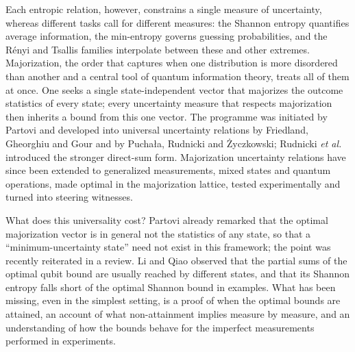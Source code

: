\documentclass[11pt]{article}
\theoremstyle{definition}
\begin{document}
Each entropic relation, however, constrains a single measure of uncertainty,
whereas different tasks call for different measures: the Shannon entropy
quantifies average information, the min-entropy governs guessing
probabilities\cite{KRS2009}, and the R\'enyi and Tsallis families interpolate
between these and other extremes. Majorization\cite{MarshallOlkin2011}, the
order that captures when one distribution is more disordered than another and
a central tool of quantum information
theory\cite{Nielsen1999,Gour2015,ChitambarGour2019}, treats all of them at once.
One seeks a single state-independent vector that majorizes the outcome
statistics of every state; every uncertainty measure that respects
majorization then inherits a bound from this one vector. The programme was
initiated by Partovi\cite{Partovi2011} and developed into universal uncertainty
relations by Friedland, Gheorghiu and Gour\cite{FGG2013} and by Pucha{\l}a,
Rudnicki and {\.Z}yczkowski\cite{PRZ2013}; Rudnicki \emph{et al.} introduced the
stronger direct-sum form\cite{RPZ2014}. Majorization uncertainty relations have
since been extended to generalized measurements, mixed states and quantum
operations\cite{RasteginZyczkowski2016,Baek2019,Puchala2018}, made optimal in the
majorization lattice\cite{Li2016,LiQiao2019,Yuan2023}, tested
experimentally\cite{Wang2020,Yuan2023} and turned into steering
witnesses\cite{YangQiao2026}.

What does this universality cost? Partovi already remarked that the optimal
majorization vector is in general not the statistics of any state, so that a
``minimum-uncertainty state'' need not exist in this framework\cite{Partovi2011};
the point was recently reiterated in a review\cite{Conlon2026}. Li and Qiao
observed that the partial sums of the optimal qubit bound are usually reached by
different states, and that its Shannon entropy falls short of the optimal
Shannon bound in examples\cite{LiQiao2018}. What has been missing, even in the
simplest setting, is a proof of when the optimal bounds are attained, an account
of what non-attainment implies measure by measure, and an understanding of how
the bounds behave for the imperfect measurements performed in experiments.
\end{document}
